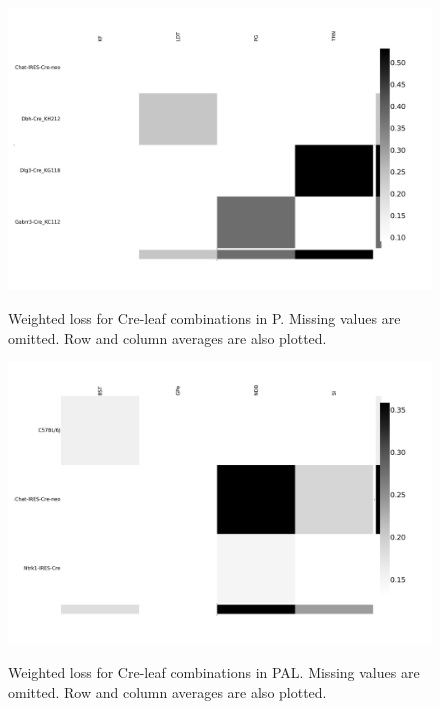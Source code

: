 \begin{figure}[H]
    \centering
    \includegraphics[width = 7in]{figs/lossdetails_771.png} 
    \label{fig:distances}
    \caption{Weighted loss for Cre-leaf combinations in P. Missing values are omitted.    Row and column averages are also plotted.}
\end{figure}
\begin{figure}[H]
    \centering
    \includegraphics[width = 7in]{figs/lossdetails_803.png} 
    \label{fig:distances}
    \caption{Weighted loss for Cre-leaf combinations in PAL. Missing values are omitted.  Row and column averages are also plotted.}
\end{figure}

